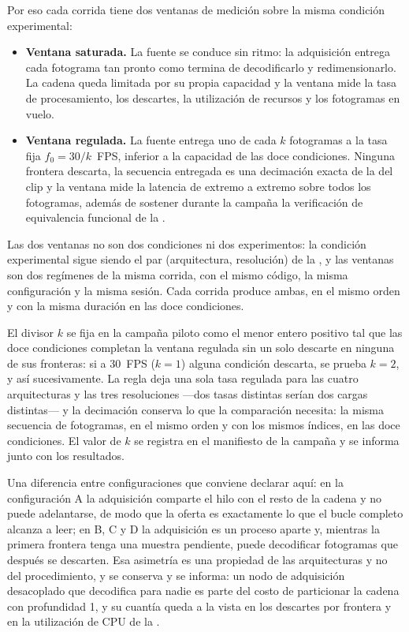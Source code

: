 Por eso cada corrida tiene dos ventanas de medición sobre la misma condición
experimental:

\begin{itemize}
  \item \textbf{Ventana saturada.} La fuente se conduce sin ritmo: la
        adquisición entrega cada fotograma tan pronto como termina de
        decodificarlo y redimensionarlo. La cadena queda limitada por su
        propia capacidad y la ventana mide la tasa de procesamiento, los
        descartes, la utilización de recursos y los fotogramas en vuelo.
  \item \textbf{Ventana regulada.} La fuente entrega uno de cada $k$
        fotogramas a la tasa fija $f_0 = 30/k$~FPS, inferior a la capacidad
        de las doce condiciones. Ninguna frontera descarta, la secuencia
        entregada es una decimación exacta de la del clip y la ventana mide
        la latencia de extremo a extremo sobre todos los fotogramas, además
        de sostener durante la campaña la verificación de equivalencia
        funcional de la .
\end{itemize}

Las dos ventanas no son dos condiciones ni dos experimentos: la condición
experimental sigue siendo el par (arquitectura, resolución) de la
, y las ventanas son dos regímenes de la misma
corrida, con el mismo código, la misma configuración y la misma sesión. Cada
corrida produce ambas, en el mismo orden y con la misma duración en las doce
condiciones.

El divisor $k$ se fija en la campaña piloto como el menor entero positivo
tal que las doce condiciones completan la ventana regulada sin un solo
descarte en ninguna de sus fronteras: si a 30~FPS ($k=1$) alguna condición
descarta, se prueba $k=2$, y así sucesivamente. La regla deja una sola tasa
regulada para las cuatro arquitecturas y las tres resoluciones ---dos tasas
distintas serían dos cargas distintas--- y la decimación conserva lo que la
comparación necesita: la misma secuencia de fotogramas, en el mismo orden y
con los mismos índices, en las doce condiciones. El valor de $k$ se registra
en el manifiesto de la campaña y se informa junto con los resultados.

Una diferencia entre configuraciones que conviene declarar aquí: en la
configuración A la adquisición comparte el hilo con el resto de la cadena y
no puede adelantarse, de modo que la oferta es exactamente lo que el bucle
completo alcanza a leer; en B, C y D la adquisición es un proceso aparte y,
mientras la primera frontera tenga una muestra pendiente, puede decodificar
fotogramas que después se descarten. Esa asimetría es una propiedad de las
arquitecturas y no del procedimiento, y se conserva y se informa: un nodo de
adquisición desacoplado que decodifica para nadie es parte del costo de
particionar la cadena con profundidad 1, y su cuantía queda a la vista en
los descartes por frontera y en la utilización de CPU de la
.

